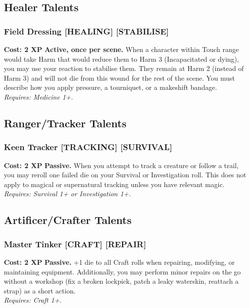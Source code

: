 \subsection*{Healer Talents}
\label{sec:minor-healer}

\subsubsection*{Field Dressing \textnormal{[HEALING] [STABILISE]}}
\label{talent:field-dressing}
\textbf{Cost: 2 XP} \textbf{Active, once per scene.} When a character within Touch range would take Harm that would reduce them to Harm 3 (Incapacitated or dying), you may use your reaction to stabilise them. They remain at Harm 2 (instead of Harm 3) and will not die from this wound for the rest of the scene. You must describe how you apply pressure, a tourniquet, or a makeshift bandage. \\
\textit{Requires: Medicine 1+.}

\subsection*{Ranger/Tracker Talents}
\label{sec:minor-ranger}

\subsubsection*{Keen Tracker \textnormal{[TRACKING] [SURVIVAL]}}
\label{talent:keen-tracker}
\textbf{Cost: 2 XP} \textbf{Passive.} When you attempt to track a creature or follow a trail, you may reroll one failed die on your Survival or Investigation roll. This does not apply to magical or supernatural tracking unless you have relevant magic. \\
\textit{Requires: Survival 1+ or Investigation 1+.}

\subsection*{Artificer/Crafter Talents}
\label{sec:minor-artificer}

\subsubsection*{Master Tinker \textnormal{[CRAFT] [REPAIR]}}
\label{talent:master-tinker}
\textbf{Cost: 2 XP} \textbf{Passive.} +1 die to all Craft rolls when repairing, modifying, or maintaining equipment. Additionally, you may perform minor repairs on the go without a workshop (fix a broken lockpick, patch a leaky waterskin, reattach a strap) as a short action. \\
\textit{Requires: Craft 1+.}

